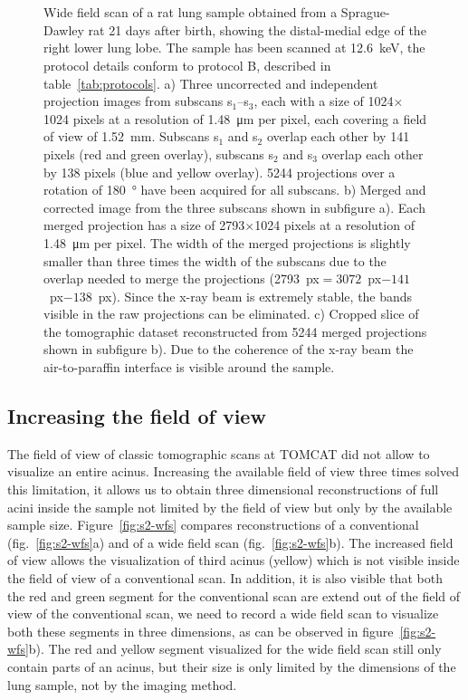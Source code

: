 	\begin{figure}[htp]%
		\\%
		\\%
			\caption{Wide field scan of a rat lung sample obtained from a Sprague-Dawley rat 21 days after birth, showing the distal-medial edge of the right lower lung lobe. The sample has been scanned at \SI{12.6}{\kilo\electronvolt}, the protocol details conform to protocol B, described in table~\ref{tab:protocols}. %
		a) Three uncorrected and independent projection images from subscans s$_1$--s$_3$, each with a size of 1024\(\times\)1024 pixels at a resolution of \SI{1.48}{\micro\meter} per pixel, each covering a field of view of \SI{1.52}{\milli\meter}. Subscans s$_1$ and s$_2$ overlap each other by 141 pixels (red and green overlay), subscans s$_2$ and s$_3$ overlap each other by 138 pixels (blue and yellow overlay). 5244 projections over a rotation of \SI{180}{\degree} have been acquired for all subscans. %
		b) Merged and corrected image from the three subscans shown in subfigure a). Each merged projection has a size of 2793\(\times\)1024 pixels at a resolution of \SI{1.48}{\micro\meter} per pixel. The width of the merged projections is slightly smaller than three times the width of the subscans due to the overlap needed to merge the projections (2793~px$=3072$~px$-141$~px$-138$~px). Since the x-ray beam is extremely stable, the bands visible in the raw projections can be eliminated. %
		c) Cropped slice of the tomographic dataset reconstructed from 5244 merged projections shown in subfigure b). Due to the coherence of the x-ray beam the air-to-paraffin interface is visible around the sample.%
		}%
		\label{fig:wide field scan results}%
	\end{figure}
\fi

\subsection{Increasing the field of view}
The field of view of classic tomographic scans at TOMCAT did not allow to visualize an entire acinus. Increasing the available field of view three times solved this limitation, it allows us to obtain three dimensional reconstructions of full acini inside the sample not limited by the field of view but only by the available sample size. Figure~\ref{fig:s2-wfs} compares reconstructions of a conventional (fig.~\ref{fig:s2-wfs}a) and of a wide field scan (fig.~\ref{fig:s2-wfs}b). The increased field of view allows the visualization of third acinus (yellow) which is not visible inside the field of view of a conventional scan. In addition, it is also visible that both the red and green segment for the conventional scan are extend out of the field of view of the conventional scan, we need to record a wide field scan to visualize both these segments in three dimensions, as can be observed in figure~\ref{fig:s2-wfs}b). The red and yellow segment visualized for the wide field scan still only contain parts of an acinus, but their size is only limited by the dimensions of the lung sample, not by the imaging method.

